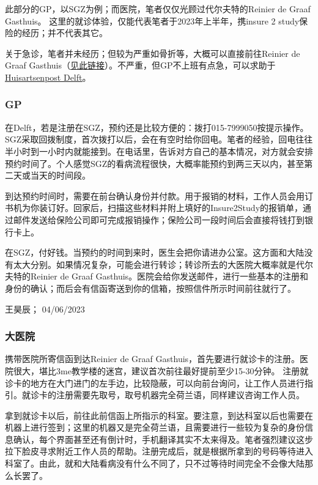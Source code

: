 此部分的GP，以SGZ为例；而医院，笔者仅仅光顾过代尔夫特的Reinier de Graaf Gasthuis。 这里的就诊体验，仅能代表笔者于2023年上半年，携insure 2 study保险的经历；并不代表其它。

关于急诊，笔者并未经历；但较为严重如骨折等，大概可以直接前往Reinier de Graaf Gasthuis（\href{https://reinierdegraaf.nl/specialisme/spoedeisende-hulp}{\uline{见此链接}}）。不严重，但GP不上班有点急，可以求助于\href{https://hapschievliet.nl/language/english/}{\uline{Huisartsenpost Delft}}。


\subsubsection{GP}
在Delft，若是注册在SGZ，预约还是比较方便的：拨打015-7999050按提示操作。SGZ采取回拨制度，首次拨打以后，会在有空时给你回电。笔者的经验，回电往往半小时到一小时内就能接到。在电话里，告诉对方自己的基本情况，对方就会安排预约时间了。个人感觉SGZ的看病流程很快，大概率能预约到两三天以内，甚至第二天或当天的时间段。

到达预约时间时，需要在前台确认身份并付款。用于报销的材料，工作人员会用订书机为你装订好。回家后，扫描这些材料并附上填好的Insure2Study的报销单，通过邮件发送给保险公司即可完成报销操作；保险公司一段时间后会直接将钱打到银行卡上。

在SGZ，付好钱。当预约的时间到来时，医生会把你请进办公室。这方面和大陆没有太大分别。如果情况复杂，可能会进行转诊；转诊所去的大医院大概率就是代尔夫特的Reinier de Graaf Gasthuis。医院会给你发送邮件，进行一些基本的注册和身份的确认；而后会有信函寄送到你的信箱，按照信件所示时间前往就行了。
\begin{flushright}
王昊辰； 04/06/2023
\end{flushright}

\subsubsection{大医院}
携带医院所寄信函到达Reinier de Graaf Gasthuis，首先要进行就诊卡的注册。医院很大，堪比3me教学楼的迷宫，建议首次前往最好提前至少15-30分钟。 注册就诊卡的地方在大门进门的左手边，比较隐蔽，可以向前台询问，让工作人员进行指引。就诊卡的注册需要先取号，取号机器完全荷兰语，同样建议咨询工作人员。

拿到就诊卡以后，前往此前信函上所指示的科室。要注意，到达科室以后也需要在机器上进行签到；这里的机器又是完全荷兰语，且需要进行一些较为复杂的身份信息确认，每个界面甚至还有倒计时，手机翻译其实不太来得及。笔者强烈建议这步拉下脸皮寻求附近工作人员的帮助。注册完成后，就是根据所拿到的号码等待进入科室了。由此，就和大陆看病没有什么不同了，只不过等待时间完全不会像大陆那么长罢了。

